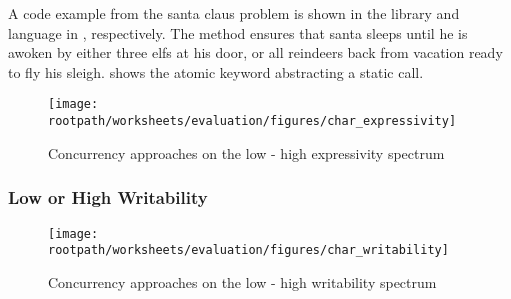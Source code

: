 
A code example from the santa claus problem is shown in the library and language in   , respectively. The method ensures that santa sleeps until he is awoken by either three elfs at his door, or all reindeers back from vacation ready to fly his sleigh.  shows the atomic keyword abstracting a static call.





\begin{figure}[htbp]
\centering
 \texttt{[image: \\rootpath/worksheets/evaluation/figures/char\_expressivity]} 
 \caption{Concurrency approaches on the low - high expressivity spectrum}
\label{fig:char_expressivity}
\end{figure}

\subsubsection{Low or High Writability}
\begin{figure}[htbp]
\centering
 \texttt{[image: \\rootpath/worksheets/evaluation/figures/char\_writability]} 
 \caption{Concurrency approaches on the low - high writability spectrum}
\label{fig:char_tl_writability}
\end{figure}

\worksheetend
